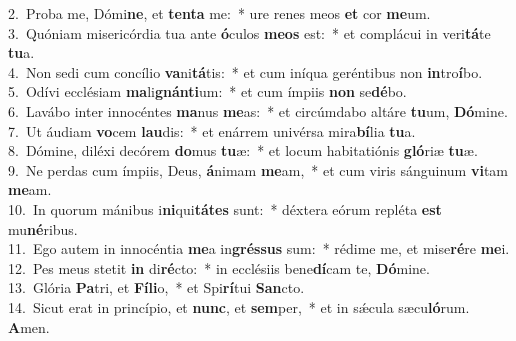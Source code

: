 {2.~}Proba me, Dómi\textbf{ne}, et \textbf{ten}\textbf{ta} me:~* ure renes meos \textbf{et} cor \textbf{me}um.\\
{3.~}Quóniam misericórdia tua ante \textbf{ó}culos \textbf{me}\textbf{os} est:~* et complácui in veri\textbf{tá}te \textbf{tu}a.\\
{4.~}Non sedi cum concílio \textbf{va}ni\textbf{tá}tis:~* et cum iníqua geréntibus non \textbf{in}tro\textbf{í}bo.\\
{5.~}Odívi ecclésiam \textbf{ma}li\textbf{gnán}\textbf{ti}um:~* et cum ímpiis \textbf{non} se\textbf{dé}bo.\\
{6.~}Lavábo inter innocéntes \textbf{ma}nus \textbf{me}as:~* et circúmdabo altáre \textbf{tu}um, \textbf{Dó}mine.\\
{7.~}Ut áudiam \textbf{vo}cem \textbf{lau}dis:~* et enárrem univérsa mira\textbf{bí}lia \textbf{tu}a.\\
{8.~}Dómine, diléxi decórem \textbf{do}mus \textbf{tu}æ:~* et locum habitatiónis \textbf{gló}riæ \textbf{tu}æ.\\
{9.~}Ne perdas cum ímpiis, Deus, \textbf{á}nimam \textbf{me}am,~* et cum viris sánguinum \textbf{vi}tam \textbf{me}am.\\
{10.~}In quorum mánibus i\textbf{ni}qui\textbf{tá}\textbf{tes} sunt:~* déxtera eórum repléta \textbf{est} mu\textbf{né}ribus.\\
{11.~}Ego autem in innocéntia \textbf{me}a in\textbf{grés}\textbf{sus} sum:~* rédime me, et mise\textbf{ré}re \textbf{me}i.\\
{12.~}Pes meus stetit \textbf{in} di\textbf{ré}cto:~* in ecclésiis bene\textbf{dí}cam te, \textbf{Dó}mine.\\
{13.~}Glória \textbf{Pa}tri, et \textbf{Fí}\textbf{li}o,~* et Spi\textbf{rí}tui \textbf{San}cto.\\
{14.~}Sicut erat in princípio, et \textbf{nunc}, et \textbf{sem}per,~* et in sǽcula sæcu\textbf{ló}rum. \textbf{A}men.\\
